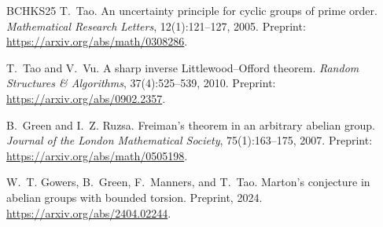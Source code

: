 \documentclass[a4paper,11pt]{amsart}
\theoremstyle{remark}
\begin{document}
\begin{thebibliography}{BCHKS25}
T.~Tao.
\newblock An uncertainty principle for cyclic groups of prime order.
\newblock \emph{Mathematical Research Letters}, 12(1):121--127, 2005.
\newblock Preprint: \url{https://arxiv.org/abs/math/0308286}.

T.~Tao and V.~Vu.
\newblock A sharp inverse Littlewood--Offord theorem.
\newblock \emph{Random Structures \& Algorithms}, 37(4):525--539, 2010.
\newblock Preprint: \url{https://arxiv.org/abs/0902.2357}.

B.~Green and I.~Z. Ruzsa.
\newblock Freiman's theorem in an arbitrary abelian group.
\newblock \emph{Journal of the London Mathematical Society}, 75(1):163--175, 2007.
\newblock Preprint: \url{https://arxiv.org/abs/math/0505198}.

W.~T. Gowers, B.~Green, F.~Manners, and T.~Tao.
\newblock Marton's conjecture in abelian groups with bounded torsion.
\newblock Preprint, 2024.
\newblock \url{https://arxiv.org/abs/2404.02244}.

\end{thebibliography}
\end{document}
